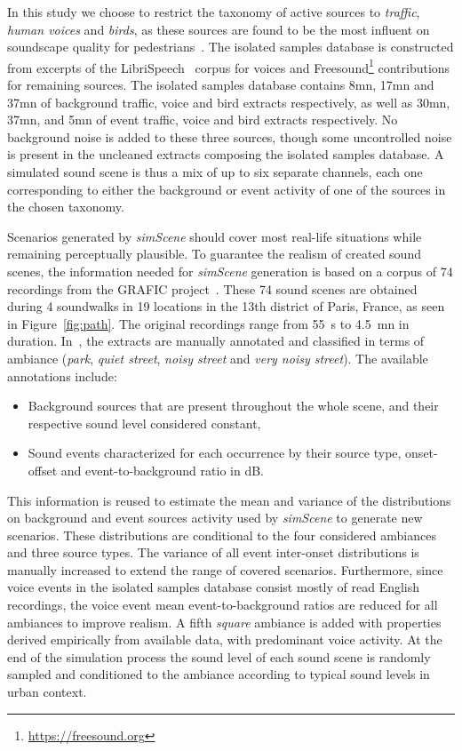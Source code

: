 \documentclass[twocolumn]{article}
\begin{document}
In this study we choose to restrict the taxonomy of active sources to \textit{traffic}, \textit{human voices} and \textit{birds}, as these sources are found to be the most influent on soundscape quality for pedestrians~\cite{lavandier2006}. The isolated samples database is constructed from excerpts of the LibriSpeech~\cite{panayotov2015} corpus for voices and Freesound\footnote{\url{https://freesound.org}} contributions for remaining sources. The isolated samples database contains 8mn, 17mn and 37mn of background traffic, voice and bird extracts respectively, as well as 30mn, 37mn, and 5mn of event traffic, voice and bird extracts respectively. No background noise is added to these three sources, though some uncontrolled noise is present in the uncleaned extracts composing the isolated samples database. A simulated sound scene is thus a mix of up to six separate channels, each one corresponding to either the background or event activity of one of the sources in the chosen taxonomy.

Scenarios generated by \textit{simScene} should cover most real-life situations while remaining perceptually plausible. To guarantee the realism of created sound scenes, the information needed for \textit{simScene} generation is based on a corpus of 74 recordings from the GRAFIC project~\cite{aumond2017}. These 74 sound scenes are obtained during 4 soundwalks in 19 locations in the 13th district of Paris, France, as seen in Figure~\ref{fig:path}. The original recordings range from 55~s to 4.5~mn in duration. In~\cite{gloaguen2017}, the extracts are manually annotated and classified in terms of ambiance (\textit{park}, \textit{quiet street}, \textit{noisy street} and \textit{very noisy street}). The available annotations include:

\begin{itemize}
\item Background sources that are present throughout the whole scene, and their respective sound level considered constant,
\item Sound events characterized for each occurrence by their source type, onset-offset and event-to-background ratio in dB.
\end{itemize}

This information is reused to estimate the mean and variance of the distributions on background and event sources activity used by \textit{simScene} to generate new scenarios. These distributions are conditional to the four considered ambiances and three source types. The variance of all event inter-onset distributions is manually increased to extend the range of covered scenarios. Furthermore, since voice events in the isolated samples database consist mostly of read English recordings, the voice event mean event-to-background ratios are reduced for all ambiances to improve realism. A fifth \textit{square} ambiance is added with properties derived empirically from available data, with predominant voice activity. At the end of the simulation process the sound level of each sound scene is randomly sampled and conditioned to the ambiance according to typical sound levels in urban context.
\end{document}
